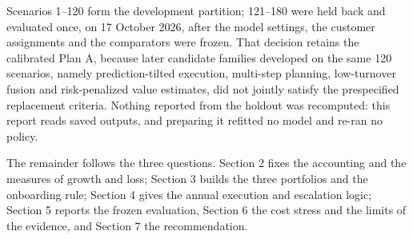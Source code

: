 Scenarios 1--120 form the development partition; 121--180 were held back and evaluated once, on 17 October 2026, after the model settings, the customer assignments and the comparators were frozen. That decision retains the calibrated Plan A, because later candidate families developed on the same 120 scenarios, namely prediction-tilted execution, multi-step planning, low-turnover fusion and risk-penalized value estimates, did not jointly satisfy the prespecified replacement criteria. Nothing reported from the holdout was recomputed: this report reads saved outputs, and preparing it refitted no model and re-ran no policy.

The remainder follows the three questions. Section 2 fixes the accounting and the measures of growth and loss; Section 3 builds the three portfolios and the onboarding rule; Section 4 gives the annual execution and escalation logic; Section 5 reports the frozen evaluation, Section 6 the cost stress and the limits of the evidence, and Section 7 the recommendation.
